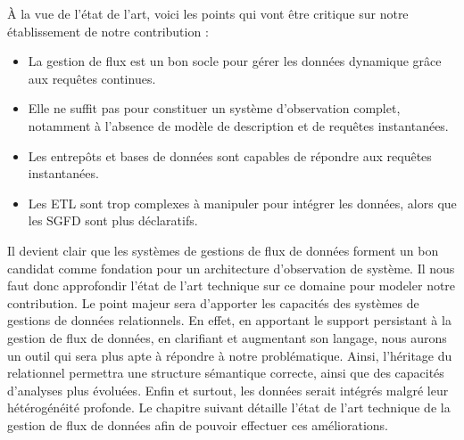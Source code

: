 À la vue de l'état de l'art, voici les points qui vont être critique sur notre établissement de notre contribution :
\begin{itemize}
    \item La gestion de flux est un bon socle pour gérer les données dynamique grâce aux requêtes continues.
    \item Elle ne suffit pas pour constituer un système d'observation complet, notamment à l'absence de modèle de description et de requêtes instantanées.
    \item Les entrepôts et bases de données sont capables de répondre aux requêtes instantanées.
    \item Les ETL sont trop complexes à manipuler pour intégrer les données, alors que les SGFD sont plus déclaratifs.
\end{itemize}
Il devient clair que les systèmes de gestions de flux de données forment un bon candidat comme fondation pour un architecture d'observation de système. Il nous faut donc approfondir l'état de l'art technique sur ce domaine pour modeler notre contribution. Le point majeur sera d'apporter les capacités des systèmes de gestions de données relationnels. En effet, en apportant le support persistant à la gestion de flux de données, en clarifiant et augmentant son langage, nous aurons un outil qui sera plus apte à répondre à notre problématique. Ainsi, l'héritage du relationnel permettra une structure sémantique correcte, ainsi que des capacités d'analyses plus évoluées. Enfin et surtout, les données serait intégrés malgré leur hétérogénéité profonde. Le chapitre suivant détaille l'état de l'art technique de la gestion de flux de données afin de pouvoir effectuer ces améliorations.